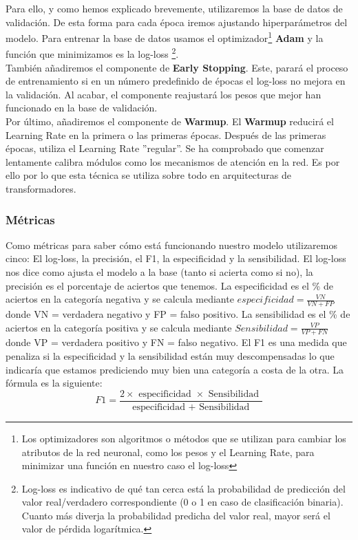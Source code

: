 \documentclass[10pt,riqno,a4paper,twoside]{article}\usepackage[]{graphicx}\usepackage[]{color}
\begin{document}
Para ello, y como hemos explicado brevemente, utilizaremos la base de datos de validación. De esta forma para cada época iremos ajustando hiperparámetros del modelo. Para entrenar la base de datos usamos el optimizador\footnote{Los optimizadores son algoritmos o métodos que se utilizan para cambiar los atributos de la red neuronal, como los pesos y el Learning Rate, para minimizar una función en nuestro caso el log-loss} \textbf{Adam} y la función que minimizamos es la log-loss \footnote{Log-loss es indicativo de qué tan cerca está la probabilidad de predicción del valor real/verdadero correspondiente (0 o 1 en caso de clasificación binaria). Cuanto más diverja la probabilidad predicha del valor real, mayor será el valor de pérdida logarítmica.}.\\

También añadiremos el componente de \textbf{Early Stopping}. Este, parará el proceso de entrenamiento si en un número predefinido de épocas el log-loss no mejora en la validación. Al acabar, el componente reajustará los pesos que mejor han funcionado en la base de validación. \\

Por último, añadiremos el componente de \textbf{Warmup}. El \textbf{Warmup} reducirá el Learning Rate en la primera o las primeras épocas. Después de las primeras épocas, utiliza el Learning Rate ''regular''. Se ha comprobado que comenzar lentamente calibra módulos como los mecanismos de atención en la red. Es por ello por lo que esta técnica se utiliza sobre todo en arquitecturas de transformadores. 


\subsubsection{Métricas}

Como métricas para saber cómo está funcionando nuestro modelo utilizaremos cinco: El log-loss, la precisión, el F1, la especificidad y la sensibilidad. El log-loss nos dice como ajusta el modelo a la base (tanto si acierta como si no), la precisión es el porcentaje de aciertos que tenemos. La especificidad es el \% de aciertos en la categoría negativa y se calcula mediante $ especificidad = \frac{VN}{VN + FP} $ donde VN = verdadera negativo y FP = falso positivo.  La sensibilidad es el \% de aciertos en la categoría positiva y se calcula mediante $ Sensibilidad = \frac{VP}{VP + FN} $ donde VP = verdadera positivo y FN = falso negativo.  El F1 es una medida que penaliza si la especificidad y la sensibilidad están muy descompensadas lo que indicaría que estamos prediciendo muy bien una categoría a costa de la otra. La fórmula es la siguiente: $$
F 1=\frac{2 \times \text { especificidad } \times \text { Sensibilidad }}{\text { especificidad }+\text { Sensibilidad }}
$$
\end{document}
